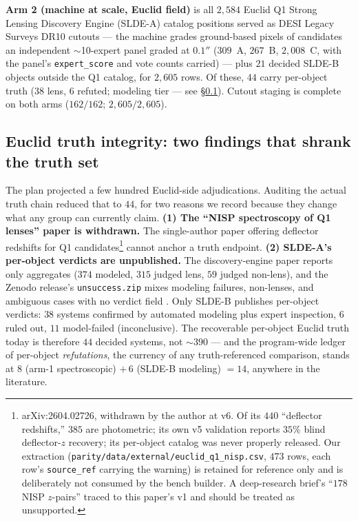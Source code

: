 \documentclass[11pt,letterpaper]{article}
\begin{document}
\textbf{Arm 2 (machine at scale, Euclid field)} is all $2{,}584$ Euclid Q1 Strong
Lensing Discovery Engine (SLDE-A) catalog positions \citep{euclidq1engine} served as DESI
Legacy Surveys DR10 cutouts \citep{legacysurvey} --- the machine grades ground-based
pixels of candidates an independent $\sim$10-expert panel graded at $0.1''$
($309$~A, $267$~B, $2{,}008$~C, with the panel's \texttt{expert\_score} and vote counts
carried) --- plus $21$ decided SLDE-B objects outside the Q1 catalog, for $2{,}605$
rows. Of these, $44$ carry per-object truth ($38$ lens, $6$ refuted; modeling tier ---
see \S\ref{sec:integrity}). Cutout staging is complete on both arms ($162/162$;
$2{,}605/2{,}605$).

\subsection{Euclid truth integrity: two findings that shrank the truth set}
\label{sec:integrity}
The plan projected a few hundred Euclid-side adjudications. Auditing the actual truth
chain reduced that to $44$, for two reasons we record because they change what any
group can currently claim. \textbf{(1) The ``NISP spectroscopy of Q1 lenses'' paper is
withdrawn.} The single-author paper offering deflector redshifts for Q1
candidates\footnote{arXiv:2604.02726, withdrawn by the author at v6. Of its $440$
``deflector redshifts,'' $385$ are photometric; its own v5 validation reports $35\%$
blind deflector-$z$ recovery; its per-object catalog was never properly released. Our
extraction (\texttt{parity/data/external/euclid\_q1\_nisp.csv}, $473$ rows, each row's
\texttt{source\_ref} carrying the warning) is retained for reference only and is
deliberately not consumed by the bench builder. A deep-research brief's ``$178$ NISP
$z$-pairs'' traced to this paper's v1 and should be treated as unsupported.} cannot
anchor a truth endpoint. \textbf{(2) SLDE-A's per-object verdicts are unpublished.} The
discovery-engine paper reports only aggregates ($374$ modeled, $315$ judged lens, $59$
judged non-lens), and the Zenodo release's \texttt{unsuccess.zip} mixes modeling
failures, non-lenses, and ambiguous cases with no verdict field
\citep{euclidq1engine,euclidq1data}. Only SLDE-B \citep{euclidq1sldeB} publishes
per-object verdicts: $38$ systems confirmed by automated modeling plus expert
inspection, $6$ ruled out, $11$ model-failed (inconclusive). The recoverable per-object
Euclid truth today is therefore $44$ decided systems, not ${\sim}390$ --- and the
program-wide ledger of per-object \emph{refutations}, the currency of any
truth-referenced comparison, stands at $8$ (arm-1 spectroscopic) $+\,6$ (SLDE-B
modeling) $=14$, anywhere in the literature.
\end{document}
